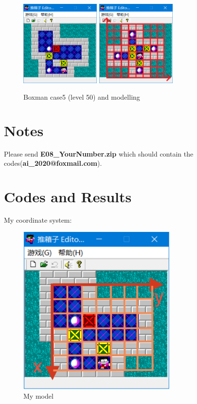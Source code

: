 \documentclass[a4paper, 11pt]{article}
\begin{document}
\begin{figure}[htb]
  \centering
  \includegraphics[width=4cm]{Pic/case5}
  \qquad
  \includegraphics[width=4cm]{Pic/model}
  \caption{Boxman case5 (level 50) and modelling}
\end{figure}



\section{Notes}


\par Please send \textbf{E08\_YourNumber.zip} which should contain the codes(\textbf{ai\_2020@foxmail.com}). 

\section{Codes and Results}


My coordinate system:


\begin{figure}[htb]
\centering
\includegraphics[width=8cm]{Pic/2}

\caption{My model}
\end{figure}
\end{document}
